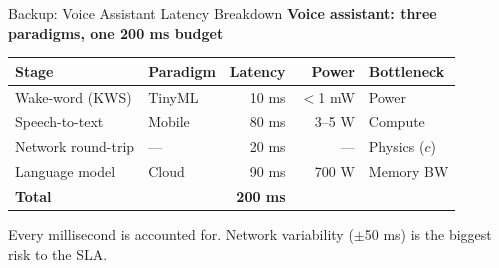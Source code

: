\documentclass[aspectratio=169, 12pt]{beamer}
\begin{document}
\appendix

\begin{frame}{Backup: Voice Assistant Latency Breakdown}
\note{
%
%
}
\small
\textbf{Voice assistant: three paradigms, one 200 ms budget}

\vspace{0.15cm}
\renewcommand{\arraystretch}{1.15}
{\footnotesize
\begin{tabular}{@{}llrrl@{}}
  \toprule
  \textbf{Stage} & \textbf{Paradigm} & \textbf{Latency} & \textbf{Power} & \textbf{Bottleneck} \\
  \midrule
  Wake-word (KWS)     & TinyML & 10 ms  & $<$1 mW & Power \\
  Speech-to-text      & Mobile & 80 ms  & 3--5 W  & Compute \\
  Network round-trip  & ---    & 20 ms  & ---     & Physics ($c$) \\
  Language model      & Cloud  & 90 ms  & 700 W   & Memory BW \\
  \midrule
  \textbf{Total}      &        & \textbf{200 ms} & & \\
  \bottomrule
\end{tabular}
}

\vspace{0.15cm}
Every millisecond is accounted for. Network variability ($\pm$50 ms) is the biggest risk to the SLA.
\end{frame}
\end{document}
